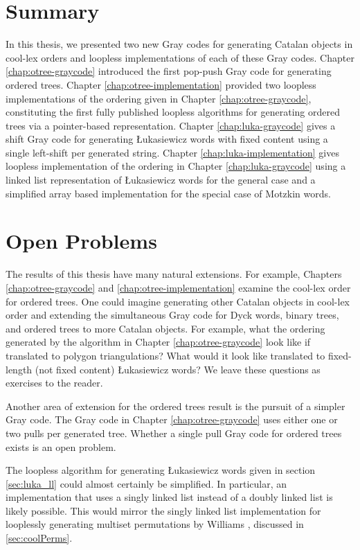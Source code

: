 \section{Summary} 
In this thesis, we presented two new Gray codes for generating Catalan objects in cool-lex orders and loopless implementations of each of these Gray codes.  Chapter \ref{chap:otree-graycode} introduced the first pop-push Gray code for generating ordered trees.  Chapter \ref{chap:otree-implementation} provided two loopless implementations of the ordering given in Chapter \ref{chap:otree-graycode}, constituting the first fully published loopless algorithms for generating ordered trees via a pointer-based representation.  Chapter \ref{chap:luka-graycode} gives a shift Gray code for generating Łukasiewicz words with fixed content using a single left-shift per generated string. Chapter \ref{chap:luka-implementation} gives loopless implementation of the ordering in Chapter \ref{chap:luka-graycode} using a linked list representation of Łukasiewicz words for the general case and a simplified array based implementation for the special case of Motzkin words.

\section{Open Problems}

The results of this thesis have many natural extensions.  For example, Chapters \ref{chap:otree-graycode} and \ref{chap:otree-implementation} examine the cool-lex order for ordered trees. One could imagine generating other Catalan objects in cool-lex order and extending the simultaneous Gray code for Dyck words, binary trees, and ordered trees to more Catalan objects.  For example, what the ordering generated by the algorithm in Chapter \ref{chap:otree-graycode} look like if translated to polygon triangulations?  What would it look like translated to fixed-length (not fixed content) Łukasiewicz words? We leave these questions as exercises to the reader.  

Another area of extension for the ordered trees result is the pursuit of a simpler Gray code. The Gray code in Chapter \ref{chap:otree-graycode} uses either one or two pulls per generated tree.  Whether a single pull Gray code for ordered trees exists is an open problem.  

The loopless algorithm for generating Łukasiewicz words given in section \ref{sec:luka_ll} could almost certainly be simplified.  In particular, an implementation that uses a singly linked list instead of a doubly linked list  is likely possible.  This would mirror the singly linked list implementation for looplessly generating multiset permutations by Williams \cite{williams2009loopless}, discussed in \ref{sec:coolPerms}.

